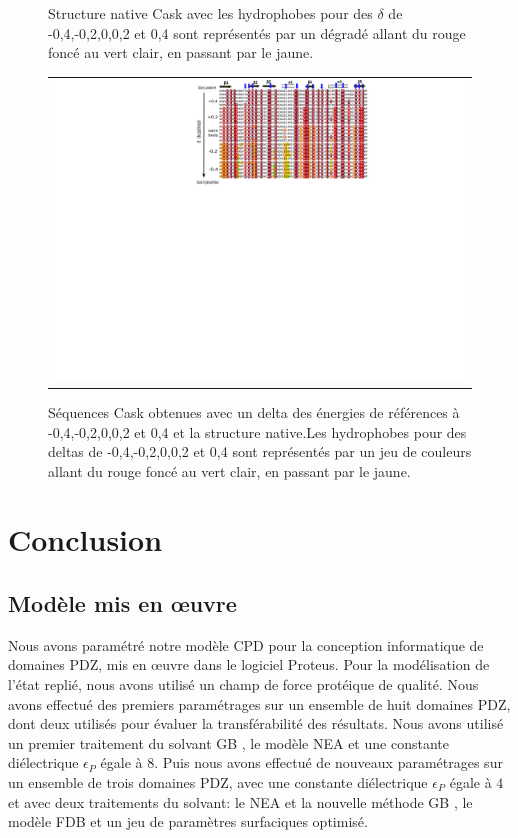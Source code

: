 \begin{figure}[!htbp]
  \centering
  \caption{\small Structure native Cask avec les hydrophobes pour des $\delta$ de -0,4,-0,2,0,0,2 et 0,4 sont représentés par un dégradé allant du rouge foncé au vert clair, en passant par le jaune.}

  \begin{tabular}{c}
    \includegraphics[width=15cm]{titration/alignCASK.png} \\
  \end{tabular}
  
  \caption{\small Séquences Cask obtenues avec un delta des énergies de références à -0,4,-0,2,0,0,2 et 0,4 et la structure native.Les hydrophobes pour des deltas de -0,4,-0,2,0,0,2 et 0,4 sont représentés par un jeu de couleurs allant du rouge foncé au vert clair, en passant par le jaune.}
  \label{titrAlignCask}
\end{figure}




\section{Conclusion}

\subsection{Modèle mis en œuvre}

Nous avons paramétré notre modèle CPD pour la conception informatique de domaines PDZ, mis en œuvre dans le logiciel Proteus. Pour la modélisation de l'état replié, nous avons utilisé un champ de force protéique de qualité. Nous avons effectué des premiers paramétrages sur un ensemble de huit domaines PDZ, dont deux utilisés  pour évaluer la transférabilité des résultats. Nous avons utilisé un premier traitement du solvant \og GB \fg, le modèle NEA et une constante diélectrique $\epsilon_P$  égale à $8$. Puis nous avons effectué de nouveaux paramétrages sur un ensemble de trois domaines PDZ, avec une constante diélectrique $\epsilon_P$  égale à $4$ et avec deux traitements du solvant: le NEA et la nouvelle méthode \og GB \fg, le modèle FDB et un jeu de paramètres surfaciques optimisé.

